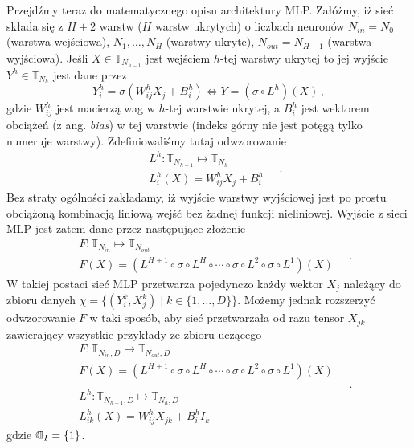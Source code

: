 \documentclass{myclass}
\begin{document}
Przejdźmy teraz do matematycznego opisu architektury MLP. Załóżmy, iż sieć składa się z \(H + 2\)
warstw (\(H\) warstw ukrytych) o liczbach neuronów \(N_{in} = N_0\) (warstwa wejściowa), \(N_1,
\ldots, N_H\) (warstwy ukryte), \(N_{out} = N_{H+1}\) (warstwa wyjściowa). Jeśli \(X \in
\mathbb{T}_{N_{h-1}}\) jest wejściem \(h\)-tej warstwy ukrytej to jej wyjście \(Y^h \in
\mathbb{T}_{N_h}\) jest dane przez
\begin{equation*}
    Y_i^h = \sigma\left(W_{ij}^hX_j + B_i^h\right) \Longleftrightarrow Y = \left(\sigma \circ L^h\right)(X)\,,
\end{equation*} 
gdzie \(W_{ij}^h\) jest macierzą wag w \(h\)-tej warstwie ukrytej, a \(B_i^h\) jest wektorem
obciążeń (z ang. \textit{bias}) w tej warstwie (indeks górny nie jest potęgą tylko numeruje
warstwy). Zdefiniowaliśmy tutaj odwzorowanie
\begin{equation*}
    \begin{split}
        &L^h : \mathbb{T}_{N_{h-1}} \mapsto \mathbb{T}_{N_{h}}\\
        &L_i^h(X) = W_{ij}^hX_j + B_i^h
    \end{split}\quad.
\end{equation*}
Bez straty ogólności zakładamy, iż wyjście warstwy wyjściowej jest po prostu obciążoną kombinacją
liniową wejść bez żadnej funkcji nieliniowej. Wyjście z sieci MLP jest zatem dane przez następujące
złożenie
\begin{equation*}
    \begin{split}
        &F: \mathbb{T}_{N_{in}} \mapsto \mathbb{T}_{N_{out}}\\
        &F(X) = \left(L^{H+1} \circ \sigma \circ L^H \circ \cdots \circ \sigma \circ L^2 \circ \sigma \circ L^1\right)(X)
    \end{split}\quad.
\end{equation*}
W takiej postaci sieć MLP przetwarza pojedynczo każdy wektor \(X_j\) należący do zbioru danych
\(\chi = \{(Y_i^k, X_j^k) \mid k \in \{1,\ldots,D\}\}\). Możemy jednak rozszerzyć odwzorowanie \(F\)
w taki sposób, aby sieć przetwarzała od razu tensor \(X_{jk}\) zawierający wszystkie przykłady ze
zbioru uczącego
\begin{equation*}
    \begin{split}
        &F: \mathbb{T}_{N_{in}, D} \mapsto \mathbb{T}_{N_{out}, D}\\
        &F(X) = \left(L^{H+1} \circ \sigma \circ L^H \circ \cdots \circ \sigma \circ L^2 \circ \sigma \circ L^1\right)(X)\\
        &\\
        &L^h: \mathbb{T}_{N_{h-1}, D} \mapsto \mathbb{T}_{N_{h}, D}\\
        &L_{ik}^h(X) = W_{ij}^h X_{jk} + B_i^h I_k
    \end{split}\quad.
\end{equation*}
gdzie \(\text{\reflectbox{$\mathbb{D}$}}_I = \{1\}\).
\end{document}
